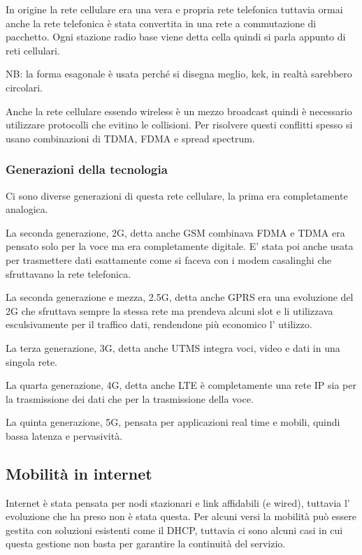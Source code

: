 In origine la rete cellulare era una vera e propria rete telefonica tuttavia ormai anche la rete telefonica è stata convertita in una rete a commutazione di pacchetto.
Ogni stazione radio base viene detta cella quindi si parla appunto di reti cellulari.

NB: la forma esagonale è usata perché si disegna meglio, kek, in realtà sarebbero circolari.

Anche la rete cellulare essendo wireless è un mezzo broadcast quindi è necessario utilizzare protocolli che evitino le collisioni.
Per risolvere questi conflitti spesso si usano combinazioni di TDMA, FDMA e spread spectrum.

\subsubsection{Generazioni della tecnologia}
Ci sono diverse generazioni di questa rete cellulare, la prima era completamente analogica.

La seconda generazione, 2G, detta anche GSM combinava FDMA e TDMA era pensato solo per la voce ma era completamente digitale.
E' stata poi anche usata per trasmettere dati esattamente come si faceva con i modem casalinghi che sfruttavano la rete telefonica.

La seconda generazione e mezza, 2.5G, detta anche GPRS era una evoluzione del 2G che sfruttava sempre la stessa rete ma prendeva alcuni slot e li utilizzava esculsivamente per il traffico dati, rendendone più economico l' utilizzo.

La terza generazione, 3G, detta anche UTMS integra voci, video e dati in una singola rete.

La quarta generazione, 4G, detta anche LTE è completamente una rete IP sia per la trasmissione dei dati che per la trasmissione della voce.

La quinta generazione, 5G, pensata per applicazioni real time e mobili, quindi bassa latenza e pervasività.

\subsection{Mobilità in internet}
Internet è stata pensata per nodi stazionari e link affidabili (e wired), tuttavia l' evoluzione che ha preso non è stata questa.
Per alcuni versi la mobilità può essere gestita con soluzioni esistenti come il DHCP, tuttavia ci sono alcuni casi in cui questa gestione non basta per garantire la continuità del servizio.


